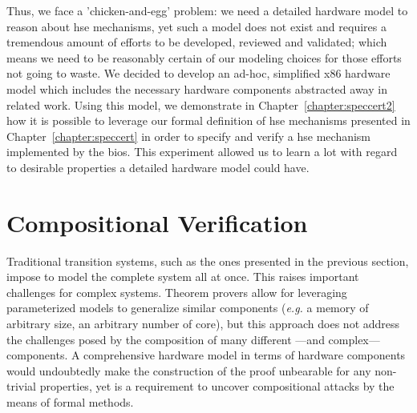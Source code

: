 Thus, we face a 'chicken-and-egg' problem: we need a detailed hardware model to
reason about \ac{hse} mechanisms, yet such a model does not exist and requires a
tremendous amount of efforts to be developed, reviewed and validated; which
means we need to be reasonably certain of our modeling choices for those efforts
not going to waste. 
%
We decided to develop an ad-hoc, simplified x86 hardware model which includes
the necessary hardware components abstracted away in related work.
%
Using this model, we demonstrate in Chapter~\ref{chapter:speccert2} how it is
possible to leverage our formal definition of \ac{hse} mechanisms presented in
Chapter~\ref{chapter:speccert} in order to specify and verify a \ac{hse}
mechanism implemented by the \ac{bios}.
%
This experiment allowed us to learn a lot with regard to desirable properties a
detailed hardware model could have.

\section{Compositional Verification}
\label{section:sota:compsec}

Traditional transition systems, such as the ones presented in the previous
section, impose to model the complete system all at once.
%
This raises important challenges for complex systems.
%
Theorem provers allow for leveraging parameterized models to generalize similar
components (\emph{e.g.} a memory of arbitrary size, an arbitrary number of
core), but this approach does not address the challenges posed by the
composition of many different ---and complex--- components.
%
A comprehensive hardware model in terms of hardware components would undoubtedly
make the construction of the proof unbearable for any non-trivial properties,
yet is a requirement to uncover compositional attacks by the means of formal
methods.
%

